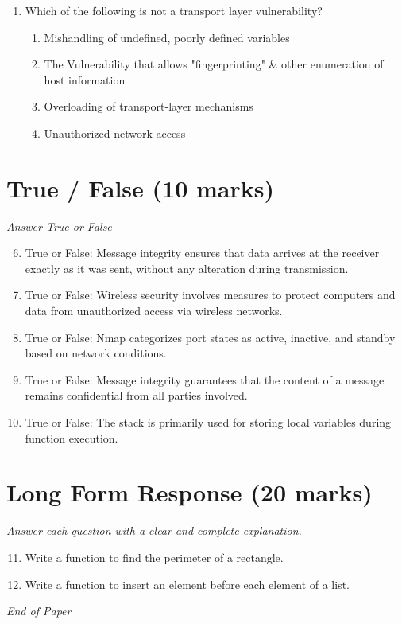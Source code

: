\documentclass[12pt]{article}
\begin{document}
\begin{enumerate}[label=\arabic*.]
\begin{enumerate}[label=(\alph*)]
    \item To locate firewalls
\end{enumerate}
\item Which of the following is not a transport layer vulnerability?
\begin{enumerate}[label=(\alph*)]
    \item Mishandling of undefined, poorly defined variables
    \item The Vulnerability that allows "fingerprinting" \& other enumeration of host information
    \item Overloading of transport-layer mechanisms
    \item Unauthorized network access
\end{enumerate}
\end{enumerate}

\section*{True / False (10 marks)}
\textit{Answer True or False}
\begin{enumerate}[label=\arabic*.]
\setcounter{enumi}{5}
\item True or False: Message integrity ensures that data arrives at the receiver exactly as it was sent, without any alteration during transmission.
\item True or False: Wireless security involves measures to protect computers and data from unauthorized access via wireless networks.
\item True or False: Nmap categorizes port states as active, inactive, and standby based on network conditions.
\item True or False: Message integrity guarantees that the content of a message remains confidential from all parties involved.
\item True or False: The stack is primarily used for storing local variables during function execution.
\end{enumerate}

\section*{Long Form Response (20 marks)}
\textit{Answer each question with a clear and complete explanation.}
\begin{enumerate}[label=\arabic*.]
\setcounter{enumi}{10}
\item Write a function to find the perimeter of a rectangle.
\item Write a function to insert an element before each element of a list.
\end{enumerate}

\vfill
\noindent\textit{End of Paper}
\end{document}
